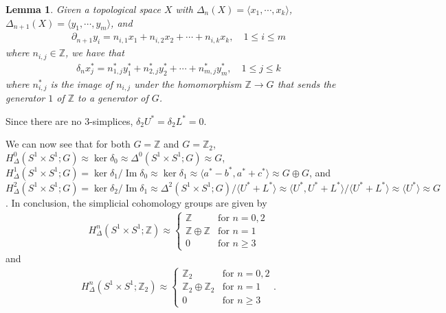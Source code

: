 \documentclass[12pt]{article}
\DeclareMathOperator{\im}{Im}
\newcommand{\iso}{\approx}
\newtheorem{lemma}[theorem]{Lemma}
\begin{document}
\begin{enumerate}
\begin{enumerate}
                \begin{lemma} \label{lem:duality}
                    \sloppy
                    Given a topological space $X$ with $\Delta_n(X) = \langle x_1, \cdots, x_k \rangle$, $\Delta_{n + 1}(X) = \langle y_1, \cdots, y_m \rangle$, and
                    \begin{align*}
                        \partial_{n + 1} y_i = n_{i, 1} x_1 + n_{i, 2} x_2 + \cdots + n_{i, k} x_k, \quad 1 \leq i \leq m
                    \end{align*}
                    where $n_{i, j} \in \mathbb{Z}$, we have that
                    \begin{align*}
                        \delta_n x_j^* = n_{1, j}^* y_1^* + n_{2, j}^* y_2^* + \cdots + n_{m, j}^* y_m^*, \quad 1 \leq j \leq k
                    \end{align*}
                    where $n_{i, j}^*$ is the image of $n_{i, j}$ under the homomorphism $\mathbb{Z} \to G$ that sends the generator $1$ of $\mathbb{Z}$ to a generator of $G$.
                \end{lemma}
                Since there are no 3-simplices, $\delta_2 U^* = \delta_2 L^* = 0$. \par
                We can now see that for both $G = \mathbb{Z}$ and $G = \mathbb{Z}_2$, $H_\Delta^0(S^1 \times S^1; G) \iso \ker\delta_0 \iso \Delta^0(S^1 \times S^1; G) \iso G$, $H_\Delta^1(S^1 \times S^1; G) = \ker\delta_1 / \im\delta_0 \iso \ker\delta_1 \iso \langle a^* - b^*, a^* + c^* \rangle \iso G \oplus G$, and $H_\Delta^2(S^1 \times S^1; G) = \ker\delta_2 / \im\delta_1 \iso \Delta^2(S^1 \times S^1; G) / \langle U^* + L^* \rangle \iso \langle U^*, U^* + L^* \rangle / \langle U^* + L^* \rangle \iso \langle U^* \rangle \iso G$.
                In conclusion, the simplicial cohomology groups are given by
                \begin{align*}
                    H_\Delta^n(S^1 \times S^1; \mathbb{Z}) \iso \begin{cases}
                        \mathbb{Z} &\text{for } n = 0, 2 \\
                        \mathbb{Z} \oplus \mathbb{Z} &\text{for } n = 1 \\
                        0 &\text{for } n \geq 3
                    \end{cases}
                \end{align*}
                and
                \begin{align*}
                    H_\Delta^n(S^1 \times S^1; \mathbb{Z}_2) \iso \begin{cases}
                        \mathbb{Z}_2 &\text{for } n = 0, 2 \\
                        \mathbb{Z}_2 \oplus \mathbb{Z}_2 &\text{for } n = 1 \\
                        0 &\text{for } n \geq 3
                    \end{cases}.
                \end{align*}


\end{enumerate}
\end{enumerate}
\end{document}
